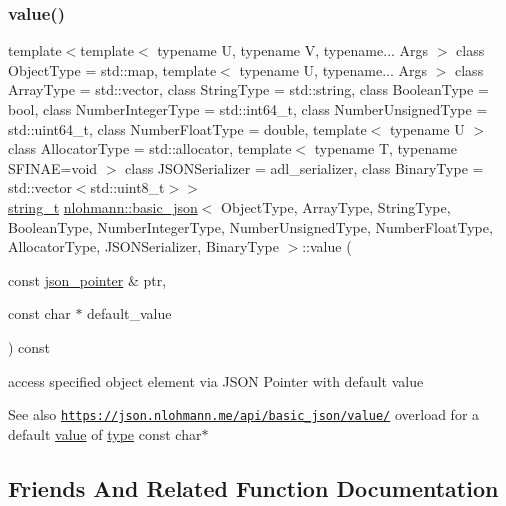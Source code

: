 \subsubsection{\texorpdfstring{value()}{value()}\hspace{0.1cm}{\footnotesize\ttfamily [4/4]}}
{\footnotesize\ttfamily template$<$template$<$ typename U, typename V, typename... Args $>$ class Object\+Type = std\+::map, template$<$ typename U, typename... Args $>$ class Array\+Type = std\+::vector, class String\+Type  = std\+::string, class Boolean\+Type  = bool, class Number\+Integer\+Type  = std\+::int64\+\_\+t, class Number\+Unsigned\+Type  = std\+::uint64\+\_\+t, class Number\+Float\+Type  = double, template$<$ typename U $>$ class Allocator\+Type = std\+::allocator, template$<$ typename T, typename S\+F\+I\+N\+A\+E=void $>$ class J\+S\+O\+N\+Serializer = adl\+\_\+serializer, class Binary\+Type  = std\+::vector$<$std\+::uint8\+\_\+t$>$$>$ \\
\hyperlink{classnlohmann_1_1basic__json_a33593865ffb1860323dcbd52425b90c8}{string\+\_\+t} \hyperlink{classnlohmann_1_1basic__json}{nlohmann\+::basic\+\_\+json}$<$ Object\+Type, Array\+Type, String\+Type, Boolean\+Type, Number\+Integer\+Type, Number\+Unsigned\+Type, Number\+Float\+Type, Allocator\+Type, J\+S\+O\+N\+Serializer, Binary\+Type $>$\+::value (\begin{DoxyParamCaption}\item[{const \hyperlink{classnlohmann_1_1basic__json_aa8f1f93b32da01b42413643be32b2c27}{json\+\_\+pointer} \&}]{ptr,  }\item[{const char $\ast$}]{default\+\_\+value }\end{DoxyParamCaption}) const\hspace{0.3cm}{\ttfamily [inline]}}



access specified object element via J\+S\+ON Pointer with default value 

\begin{DoxySeeAlso}{See also}
\href{https://json.nlohmann.me/api/basic_json/value/}{\tt https\+://json.\+nlohmann.\+me/api/basic\+\_\+json/value/} overload for a default \hyperlink{classnlohmann_1_1basic__json_a11641b35219676b225d9bd15c7677659}{value} of \hyperlink{classnlohmann_1_1basic__json_a5b7c4b35a0ad9f97474912a08965d7ad}{type} const char$\ast$ 
\end{DoxySeeAlso}


\subsection{Friends And Related Function Documentation}
\mbox{\label{classnlohmann_1_1basic__json_a6e2e21da48f5d9471716cd868a068327}} 
